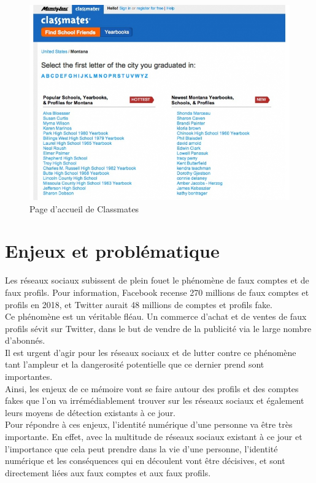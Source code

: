 \documentclass[12pt]{report}
\begin{document}
\begin{figure}[h]
    \includegraphics[width=180mm]{navigation-dans-classmates.jpg}
    \caption{Page d'accueil de Classmates}
\label{fig:Page d'accueil de Classmates}
  \end{figure}

\section{Enjeux et problématique}
Les réseaux sociaux subissent de plein fouet le phénomène de faux comptes et de faux profils.  Pour information, Facebook recense 270 millions de faux comptes et profils en 2018, et Twitter aurait 48 millions de comptes et profils fake.\\

Ce phénomène est un véritable fléau. Un commerce d'achat et de ventes de faux profils sévit sur Twitter, dans le but de vendre de la publicité via le large nombre d’abonnés. \\

Il est urgent d'agir pour les réseaux sociaux et de lutter contre ce phénomène tant l'ampleur et la dangerosité potentielle que ce dernier prend sont importantes.\\ 

Ainsi, les enjeux de ce mémoire vont se faire autour des profils et des comptes fakes que l'on va irrémédiablement trouver sur les réseaux sociaux et également leurs moyens de détection existants à ce jour. \\ 

Pour répondre à ces enjeux, l'identité numérique d'une personne va être très importante. En effet, avec la multitude de réseaux sociaux existant à ce jour et l'importance que cela peut prendre dans la vie d'une personne, l'identité numérique et les conséquences qui en découlent vont être décisives, et sont directement liées aux faux comptes et aux faux profils.\\
\end{document}
